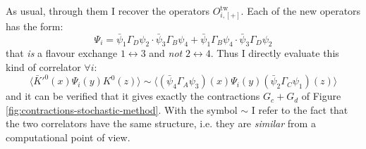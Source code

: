 \documentclass[english, LaM, oneside, noexaminfo]{sapthesis}
\begin{document}
As usual, through them I recover the operators $O_{i,[+]}^\text{tw}$.
Each of the new operators has the form:
$$\Psi_i = \bar\psi_1 \Gamma_D \psi_2 \cdot \bar\psi_3 \Gamma_B \psi_4 + \bar\psi_1 \Gamma_B \psi_4 \cdot \bar\psi_3 \Gamma_D \psi_2$$
that {\it is} a flavour exchange $1 \leftrightarrow 3$ and {\it not} $2 \leftrightarrow 4$.
Thus I directly evaluate this kind of correlator $\forall i$:
$$\bigg\langle \bar K'^0(x) \Psi_i (y) K^0(z) \bigg\rangle \sim \bigg\langle \left(\bar\psi_4 \Gamma_A \psi_3 \right) (x) \Psi_i (y) \left(\bar\psi_2 \Gamma_C \psi_1 \right) (z) \bigg\rangle$$
and it can be verified that it gives exactly the contractions $G_c + G_d$ of Figure \ref{fig:contractions-stochastic-method}.
With the symbol $\sim$ I refer to the fact that the two correlators have the same structure, i.e. they are {\it similar} from a computational point of view.



\appendix %
\end{document}
